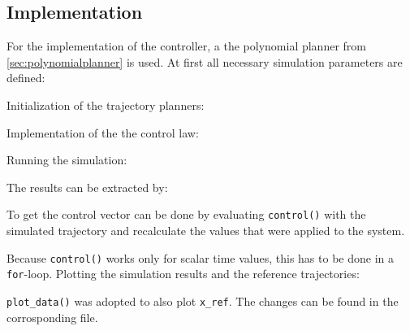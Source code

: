 \documentclass[a4paper,11pt,headings=standardclasses,parskip=half]{scrartcl}
\newcommand{\listcode}[3]{}
\newcommand{\listcodeffcontrol}[2]{\listcode{#1}{#2}{../sim/02_car_feedforward_control.py}}
\begin{document}
\subsection{Implementation}
For the implementation of the controller, a the polynomial planner from \ref{sec:polynomialplanner} is used.
At first all necessary simulation parameters are defined:
\listcodeffcontrol{21}{27}
Initialization of the trajectory planners:
\listcodeffcontrol{30}{45}
Implementation of the the control law:
\listcodeffcontrol{70}{95}
Running the simulation:
\listcodeffcontrol{298}{298}
The results can be extracted by:
\listcodeffcontrol{299}{299}
To get the control vector can be done by evaluating \texttt{control()} with the simulated trajectory and recalculate the values that were applied to the system. 
\listcodeffcontrol{300}{302}
Because \texttt{control()} works only for scalar time values, this has to be done in a \texttt{for}-loop.
Plotting the simulation results and the reference trajectories:
\listcodeffcontrol{307}{318}
\texttt{plot\_data()} was adopted to also plot \texttt{x\_ref}. The changes can be found in the corrosponding file.
\end{document}

